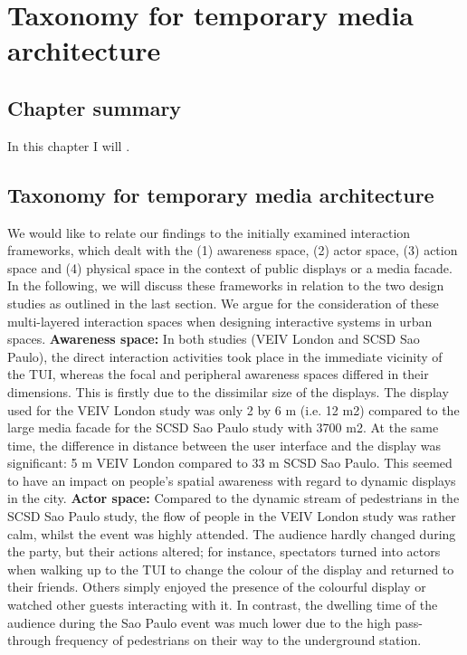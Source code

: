 \chapter{Taxonomy for temporary media architecture}
\label{chapterlabel6a}

\section*{Chapter summary}

In this chapter I will .\newpage


\section{Taxonomy for temporary media architecture}


We would like to relate our findings to the initially examined interaction frameworks, which dealt with the (1) awareness space, (2) actor space, (3) action space and (4) physical space in the context of public displays or a media facade. 
In the following, we will discuss these frameworks in relation to the two design studies as outlined in the last section. 
We argue for the consideration of these multi-layered interaction spaces when designing interactive systems in urban spaces.
\textbf{Awareness space:} In both studies (VEIV London and SCSD Sao Paulo),
the direct interaction activities took place in the immediate vicinity of the TUI, whereas the focal and peripheral awareness spaces differed in their dimensions.
This is firstly due to the dissimilar size of the displays. The display used for the VEIV London study was only 2 by 6 m (i.e. 12 m2) compared to the large media facade for the SCSD Sao Paulo study with 3700 m2.  
At the same time, the difference in distance between the user interface and the display was significant: 5 m VEIV London compared to 33 m SCSD Sao Paulo. 
This seemed to have an impact on people’s spatial awareness with regard to dynamic displays in the city.
\textbf{Actor space:} Compared to the dynamic stream of pedestrians in the SCSD Sao Paulo study, the flow of people in the VEIV London study was rather calm, whilst the event was highly attended. 
The audience hardly changed during the party, but their actions altered; for instance, spectators turned into actors when walking up to the TUI to change the colour of the display and returned to their friends. 
Others simply enjoyed the presence of the colourful display or watched other guests interacting with it. 
In contrast, the dwelling time of the audience during the Sao Paulo event was much lower due to the high pass-through frequency of pedestrians on their way to the underground station.
